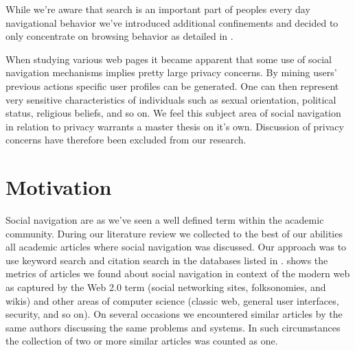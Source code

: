 While we're aware that search is an important part of peoples every day
navigational behavior we've introduced additional confinements and decided to
only concentrate on browsing behavior as detailed in
.

When studying various web pages it became apparent that some use of
social navigation mechanisms implies pretty large privacy concerns. By mining
users' previous actions specific user profiles can be generated. One can then
represent very sensitive characteristics of individuals such as sexual
orientation, political status, religious beliefs, and so on.
We feel this subject area of social navigation in relation to privacy warrants
a master thesis on it's own. Discussion of privacy concerns have therefore
been excluded from our research.

\section{Motivation}


Social navigation are as we've seen a well defined term within the academic
community.
During our literature review we collected to the best of our abilities all
academic articles where social navigation was discussed. Our approach was to
use keyword search and citation search in the databases listed in
.%
 shows the metrics of articles
we found about social navigation in context of the modern web as captured by
the Web 2.0 term (social networking sites, folksonomies, and wikis) and other
areas of computer science (classic web, general user interfaces, security, and
so on).
On several occasions we encountered similar articles by the same authors
discussing the same problems and systems. In such circumstances the collection
of two or more similar articles was counted as one.

